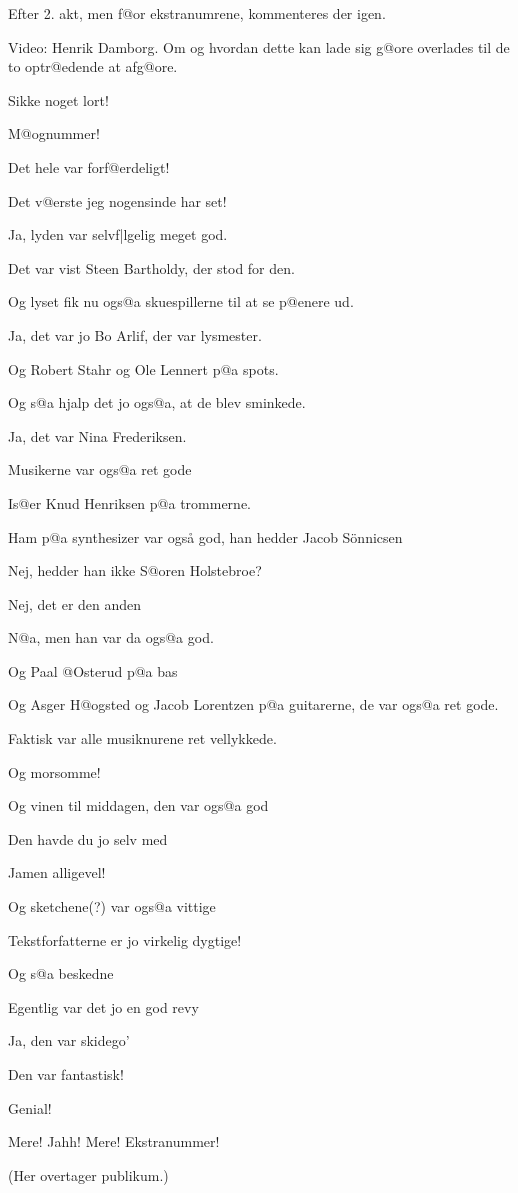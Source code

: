 \documentclass[a4paper,11pt]{article}
\begin{document}
\begin{sketch}

\scene Efter 2. akt, men f@or ekstranumrene, kommenteres der igen.

Video: Henrik Damborg.
Om og hvordan dette kan lade sig g@ore overlades til de to optr@edende
at afg@ore.


 Sikke noget lort!

 M@ognummer!

 Det hele var forf@erdeligt!

 Det v@erste jeg nogensinde har set!

 Ja, lyden var selvf|lgelig meget god.

 Det var vist Steen Bartholdy, der stod for den.

 Og lyset fik nu ogs@a skuespillerne til at se p@enere ud.

 Ja, det var jo Bo Arlif, der var lysmester.

 Og Robert Stahr og Ole Lennert p@a spots.

 Og s@a hjalp det jo ogs@a, at de blev sminkede.

 Ja, det var Nina Frederiksen.

 Musikerne var ogs@a ret gode

 Is@er Knud Henriksen p@a trommerne.

 Ham p@a synthesizer var også god, han hedder Jacob S\"onnicsen

 Nej, hedder han ikke S@oren Holstebroe?

 Nej, det er den anden

 N@a, men han var da ogs@a god.

 Og Paal @Osterud p@a bas

 Og Asger H@ogsted og Jacob Lorentzen p@a
guitarerne, de var ogs@a ret gode.

 Faktisk var alle musiknurene ret vellykkede.

 Og morsomme!

 Og vinen til middagen, den var ogs@a god

 Den havde du jo selv med

 Jamen alligevel!

 Og sketchene(?) var ogs@a vittige

 Tekstforfatterne er jo virkelig dygtige!

 Og s@a beskedne

 Egentlig var det jo en god revy

 Ja, den var skidego'

 Den var fantastisk!

 Genial!

 Mere! Jahh! Mere! Ekstranummer!

\scene (Her overtager publikum.)

\end{sketch}
\end{document}
